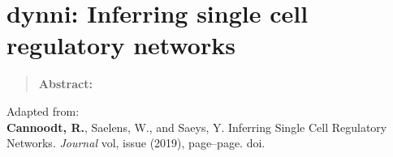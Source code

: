 \newpage{\thispagestyle{empty}\cleardoublepage}
\chapter{dynni: Inferring single cell regulatory networks} 
\label{chap:brood}

\begin{quote}
	\textbf{Abstract:} \blindtext
\end{quote}

\vfill

Adapted from:\\
\textbf{Cannoodt, R.}, Saelens, W., and Saeys, Y. Inferring Single Cell Regulatory Networks. \textit{Journal} vol, issue (2019), page--page. doi.
\newpage

\blindtext